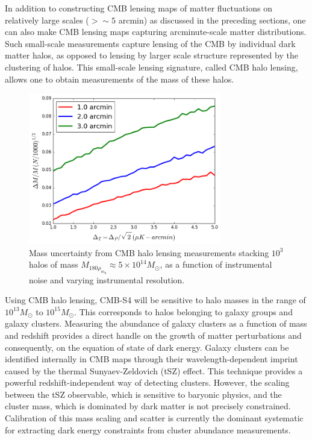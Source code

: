 \documentclass{tcibook}
\begin{document}
In addition to constructing CMB lensing maps of matter fluctuations on relatively large scales ($> \sim 5$ arcmin) as discussed in the preceding sections, one can also make CMB lensing maps capturing arcminute-scale matter distributions. Such small-scale measurements capture lensing of the CMB by individual dark matter halos, as opposed to lensing by larger scale structure represented by the clustering of halos.  This small-scale lensing signature, called CMB halo lensing, allows one to obtain measurements of the mass of these halos.  

\begin{figure}[h]
\centering 
\includegraphics[width=0.75\textwidth]{HaloLens.png}
\caption{Mass uncertainty from CMB halo lensing measurements stacking $10^3$ halos of mass $M_{180\rho_{m_0}} \approx 5\times 10^{14} M_{\odot}$, as a function of instrumental noise and varying instrumental resolution.}
\label{haloLens}
\end{figure}

Using CMB halo lensing, CMB-S4 will be sensitive to halo masses in the range of $10^{13} M_{\odot}$ to $10^{15} M_{\odot}$.  This corresponds to halos belonging to galaxy groups and galaxy clusters.  Measuring the abundance of galaxy clusters as a function of mass and redshift provides a direct handle on the growth of matter perturbations and consequently, on the equation of state of dark energy.  Galaxy clusters can be identified internally in CMB maps through their wavelength-dependent imprint caused by the thermal Sunyaev-Zeldovich (tSZ) effect.  This technique provides a powerful redshift-independent way of detecting clusters. However, the scaling between the tSZ observable, which is sensitive to baryonic physics, and the cluster mass, which is dominated by dark matter is not precisely constrained.  Calibration of this mass scaling and scatter is currently the dominant systematic for extracting dark energy constraints from cluster abundance measurements. 
\end{document}
